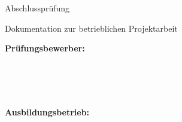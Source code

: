 
\begin{figure}[htbp]
	\centering
	
\end{figure}

\begin{center}
	\fontsize{14pt}{16pt}\selectfont

	Abschlussprüfung\
	\abschlusspruefungSaison\
	\abschlusspruefungJahr
\end{center}

\vspace{10pt}


\begin{center}
	\fontsize{14pt}{16pt}\selectfont
	\ausbildung
\end{center}

\begin{center}
	\fontsize{14pt}{16pt}\selectfont
	Dokumentation zur betrieblichen Projektarbeit
\end{center}


\vspace{16pt}


\begin{center}
	\fontsize{20pt}{20pt}\selectfont

	\textbf{\projektname}
\end{center}

\begin{center}
	\fontsize{14pt}{14pt}\selectfont

	\projektkurzbeschreibung
\end{center}




\vspace{16pt}


\begin{center}
	\fontsize{12pt}{12pt}\selectfont

	\textbf{Prüfungsbewerber:}
\end{center}

\begin{center}
	\fontsize{12pt}{16pt}\selectfont
	\pruefungsbewerberVorname\
	\pruefungsbewerberNachname
	\\
	\pruefungsbewerberAdresse
	\\
	\pruefungsbewerberPLZ\
	\pruefungsbewerberStadt
\end{center}

\vspace{32pt}

\begin{figure}[htbp]
	\centering
	
\end{figure}




\begin{center}
	\fontsize{12pt}{12pt}\selectfont

	\textbf{Ausbildungsbetrieb:}
\end{center}

\begin{center}
	\fontsize{12pt}{16pt}\selectfont
	\ausbildungsbetrieb
	\\
	\ausbildungsbetriebAdresse
	\\
	\ausbildungsbetriebPLZ\
	\ausbildungsbetriebStadt
\end{center}

